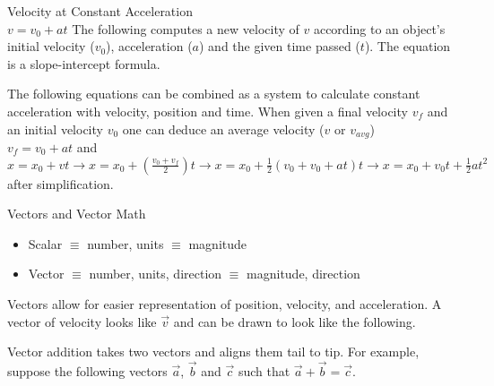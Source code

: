 \documentclass{article}
\begin{document}
\noindent
\Large
Velocity at Constant Acceleration\\
\normalsize
\noindent
$v = v_0 + at$
The following computes a new velocity of $v$ according to an object's initial velocity ($v_0$), acceleration ($a$) and the given time passed ($t$). The equation is a slope-intercept formula.

\indent
The following equations can be combined as a system to calculate constant acceleration with velocity, position and time.
When given a final velocity $v_f$ and an initial velocity $v_0$ one can deduce an average velocity ($v$ or $v_{avg}$)\\
$v_f = v_0 + at$ and $x = x_0 + vt \to x = x_0 + (\frac{v_0 + v_f}{2})t \to x = x_0 + \frac{1}{2}(v_0 + v_0 + at)t \to x = x_0 + v_0t + \frac{1}{2}at^2$ after simplification.

\noindent
\Large
Vectors and Vector Math\\
\normalsize
\begin{itemize}
  \item Scalar $\equiv$ number, units $\equiv$ magnitude
  \item Vector $\equiv$ number, units, direction $\equiv$ magnitude, direction
\end{itemize}

\indent
Vectors allow for easier representation of position, velocity, and acceleration. A vector of velocity looks like $\vec{v}$ and can be drawn to look like the following.


Vector addition takes two vectors and aligns them tail to tip. For example, suppose the following vectors $\vec{a}$, $\vec{b}$ and $\vec{c}$ such that $\vec{a} + \vec{b} = \vec{c}$.

\end{document}

